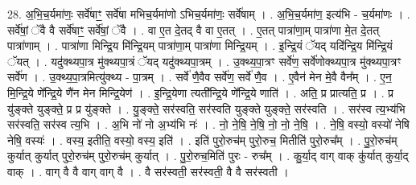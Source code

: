 \documentclass[17pt]{extarticle}
\begin{document}
28. अ॒भि॒च॒र्यमा॑णः॒ सर्वे॑षाꣳ॒॒ सर्वे॑षा मभिच॒र्यमा॑णो ऽभिच॒र्यमा॑णः॒ सर्वे॑षाम् । . अ॒भि॒च॒र्यमा॑ण॒ इत्य॑भि - च॒र्यमा॑णः । . सर्वे॑षां॒ ॅवै वै सर्वे॑षाꣳ॒॒ सर्वे॑षां॒ ॅवै । . वा ए॒त दे॒तद् वै वा ए॒तत् । . ए॒तत् पात्रा॑णा॒म् पात्रा॑णा मे॒त दे॒तत् पात्रा॑णाम् । . पात्रा॑णा मिन्द्रि॒य मि॑न्द्रि॒यम् पात्रा॑णा॒म् पात्रा॑णा मिन्द्रि॒यम् । . इ॒न्द्रि॒यं ॅयद् यदि॑न्द्रि॒य मि॑न्द्रि॒यं ॅयत् । . यदु॑क्थ्यपा॒त्र मु॑क्थ्यपा॒त्रं ॅयद् यदु॑क्थ्यपा॒त्रम् । . उ॒क्थ्य॒पा॒त्रꣳ सर्वे॑ण॒ सर्वे॑णोक्थ्यपा॒त्र मु॑क्थ्यपा॒त्रꣳ सर्वे॑ण । . उ॒क्थ्य॒पा॒त्रमित्यु॑क्थ्य - पा॒त्रम् । . सर्वे॑ णै॒वैव सर्वे॑ण॒ सर्वे॑ णै॒व । . ए॒वैन॑ मेन मे॒वै वैन᳚म् । . ए॒न॒ मि॒न्द्रि॒ये णे᳚न्द्रि॒ये णै॑न मेन मिन्द्रि॒येण॑ । . इ॒न्द्रि॒येणा त्यती᳚न्द्रि॒ये णे᳚न्द्रि॒ये णाति॑ । . अति॒ प्र प्रात्यति॒ प्र । . प्र यु॑ङ्क्ते युङ्क्ते॒ प्र प्र यु॑ङ्क्ते । . यु॒ङ्क्ते॒ सर॑स्वति॒ सर॑स्वति युङ्क्ते युङ्क्ते॒ सर॑स्वति । . सर॑स्व त्य॒भ्य॑भि सर॑स्वति॒ सर॑स्व त्य॒भि । . अ॒भि नो॑ नो अ॒भ्य॑भि नः॑ । . नो॒ ने॒षि॒ ने॒षि॒ नो॒ नो॒ ने॒षि॒ । . ने॒षि॒ वस्यो॒ वस्यो॑ नेषि नेषि॒ वस्यः॑ । . वस्य॒ इतीति॒ वस्यो॒ वस्य॒ इति॑ । . इति॑ पुरो॒रुच॑म् पुरो॒रुच॒ मितीति॑ पुरो॒रुच᳚म् । . पु॒रो॒रुच॑म् कुर्यात् कुर्यात् पुरो॒रुच॑म् पुरो॒रुच॑म् कुर्यात् । . पु॒रो॒रुच॒मिति॑ पुरः - रुच᳚म् । . कु॒र्या॒द् वाग् वाक् कु॑र्यात् कुर्या॒द् वाक् । . वाग् वै वै वाग् वाग् वै । . वै सर॑स्वती॒ सर॑स्वती॒ वै वै सर॑स्वती । \newline
\end{document}
